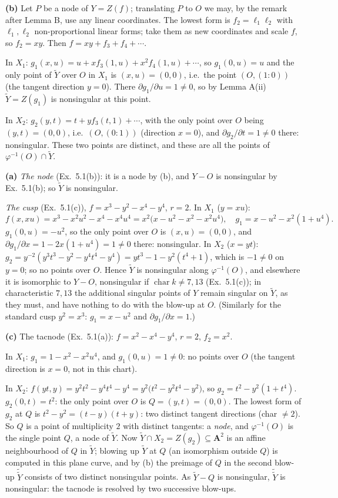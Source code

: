 \documentclass[11pt]{article}
\begin{document}
\textbf{(b)} Let $P$ be a node of $Y=Z(f)$; translating $P$ to $O$ we may, by the remark after Lemma B, use any linear coordinates. The lowest form is $f_2=\ell_1\ell_2$ with $\ell_1,\ell_2$ non-proportional linear forms; take them as new coordinates and scale $f$, so $f_2=xy$. Then $f=xy+f_3+f_4+\cdots$.

In $X_1$: $g_1(x,u)=u+xf_3(1,u)+x^2f_4(1,u)+\cdots$, so $g_1(0,u)=u$ and the only point of $\widetilde Y$ over $O$ in $X_1$ is $(x,u)=(0,0)$, i.e.\ the point $(O,(1:0))$ (the tangent direction $y=0$). There $\partial g_1/\partial u=1\neq0$, so by Lemma A(ii) $\widetilde Y=Z(g_1)$ is nonsingular at this point.

In $X_2$: $g_2(y,t)=t+yf_3(t,1)+\cdots$, with the only point over $O$ being $(y,t)=(0,0)$, i.e.\ $(O,(0:1))$ (direction $x=0$), and $\partial g_2/\partial t=1\ne0$ there: nonsingular. These two points are distinct, and these are all the points of $\varphi^{-1}(O)\cap\widetilde Y$.

\textbf{(a)} \emph{The node} (Ex.~5.1(b)): it is a node by (b), and $Y-O$ is nonsingular by Ex.~5.1(b); so $\widetilde Y$ is nonsingular.

\emph{The cusp} (Ex.~5.1(c)), $f=x^3-y^2-x^4-y^4$, $r=2$. In $X_1$ ($y=xu$):
\[
f(x,xu)=x^3-x^2u^2-x^4-x^4u^4=x^2\bigl(x-u^2-x^2-x^2u^4\bigr),\quad g_1=x-u^2-x^2(1+u^4).
\]
$g_1(0,u)=-u^2$, so the only point over $O$ is $(x,u)=(0,0)$, and $\partial g_1/\partial x=1-2x(1+u^4)=1\ne0$ there: nonsingular. In $X_2$ ($x=yt$): $g_2=y^{-2}(y^3t^3-y^2-y^4t^4-y^4)=yt^3-1-y^2(t^4+1)$, which is $-1\neq 0$ on $y=0$; so no points over $O$. Hence $\widetilde Y$ is nonsingular along $\varphi^{-1}(O)$, and elsewhere it is isomorphic to $Y-O$, nonsingular if $\operatorname{char}k\neq7,13$ (Ex.~5.1(c)); in characteristic $7,13$ the additional singular points of $Y$ remain singular on $\widetilde Y$, as they must, and have nothing to do with the blow-up at $O$. (Similarly for the standard cusp $y^2=x^3$: $g_1=x-u^2$ and $\partial g_1/\partial x=1$.)

\textbf{(c)} The tacnode (Ex.~5.1(a)): $f=x^2-x^4-y^4$, $r=2$, $f_2=x^2$.

In $X_1$: $g_1=1-x^2-x^2u^4$, and $g_1(0,u)=1\ne0$: no points over $O$ (the tangent direction is $x=0$, not in this chart).

In $X_2$: $f(yt,y)=y^2t^2-y^4t^4-y^4=y^2\bigl(t^2-y^2t^4-y^2\bigr)$, so $g_2=t^2-y^2(1+t^4)$. $g_2(0,t)=t^2$: the only point over $O$ is $Q=(y,t)=(0,0)$. The lowest form of $g_2$ at $Q$ is $t^2-y^2=(t-y)(t+y)$: two distinct tangent directions (char $\ne2$). So $Q$ is a point of multiplicity $2$ with distinct tangents: a \emph{node}, and $\varphi^{-1}(O)$ is the single point $Q$, a node of $\widetilde Y$. Now $\widetilde Y\cap X_2=Z(g_2)\subseteq\mathbf A^2$ is an affine neighbourhood of $Q$ in $\widetilde Y$; blowing up $\widetilde Y$ at $Q$ (an isomorphism outside $Q$) is computed in this plane curve, and by (b) the preimage of $Q$ in the second blow-up $\widetilde{\widetilde Y}$ consists of two distinct nonsingular points. As $\widetilde Y-Q$ is nonsingular, $\widetilde{\widetilde Y}$ is nonsingular: the tacnode is resolved by two successive blow-ups.
\end{document}
